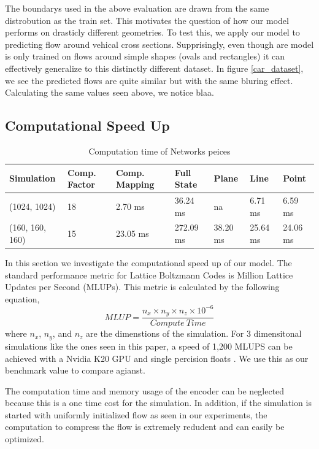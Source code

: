 \documentclass{article}
\begin{document}
The boundarys used in the above evaluation are drawn from the same distrobution as the train set. This motivates the question of how our model performs on drasticly different geometries. To test this, we apply our model to predicting flow around vehical cross sections. Supprisingly, even though are model is only trained on flows around simple shapes (ovals and rectangles) it can effectively generalize to this distinctly different dataset. In figure \ref{car_dataset}, we see the predicted flows are quite similar but with the same bluring effect. Calculating the same values seen above, we notice blaa.


\subsection{Computational Speed Up}

\begin{table}[]
\small
\caption{Computation time of Networks peices} \label{compute_times}
\centering
\begin{tabular}{|l|llllll|}
\hline
Simulation    & Comp. Factor       & Comp. Mapping       & Full State  & Plane      & Line       & Point \\ \hline
(1024, 1024)  & 18                 & 2.70 ms            & 36.24 ms   & na         & 6.71 ms   & 6.59 ms \\
(160, 160, 160) & 15                 & 23.05 ms           & 272.09 ms  & 38.20 ms  & 25.64 ms  & 24.06 ms  
\\ \hline
\end{tabular}
\label{computation_table}
\end{table}


In this section we investigate the computational speed up of our model. The standard performance metric for Lattice Boltzmann Codes is Million Lattice Updates per Second (MLUPs). This metric is calculated by the following equation,
\begin{equation}
  MLUP = \frac{n_x \times n_y \times n_z \times 10^{-6}}{Compute \ Time}
\end{equation}
 where $n_x$, $n_y$, and $n_z$ are the dimenstions of the simulation. For 3 dimensitonal simulations like the ones seen in this paper, a speed of 1,200 MLUPS can be achieved with a Nvidia K20 GPU and single percision floats \cite{januszewski2014sailfish}. We use this as our benchmark value to compare agianst.

The computation time and memory usage of the encoder can be neglected because this is a one time cost for the simulation. In addition, if the simulation is started with uniformly initialized flow as seen in our experiments, the computation to compress the flow is extremely redudent and can easily be optimized.
\end{document}
